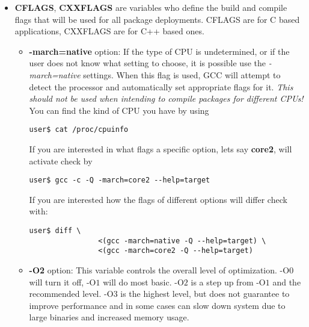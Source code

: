\documentclass[10pt,a4paper]{article}
\begin{document}
                \begin{itemize}
                    \item \textbf{CFLAGS}, \textbf{CXXFLAGS} are variables who define the build and compile flags that will be used for all package deployments. CFLAGS are for C based applications, CXXFLAGS are for C++ based ones.



                    \begin{itemize}[label={o}]

                        \item \textbf{-march=native} option: If the type of CPU is undetermined, or if the user does not know what setting to choose, it is possible use the \textit{-march=native} settings. When this flag is used, GCC will attempt to detect the processor and automatically set appropriate flags for it. \textit{This should not be used when intending to compile packages for different CPUs!}\\
                        You can find the kind of CPU you have by using
    \begin{lstlisting}[style=BashInputUser]
    user$ cat /proc/cpuinfo
    \end{lstlisting}

                        If you are interested in what flags a specific option, lets say \textbf{core2}, will activate check by
    \begin{lstlisting}[style=BashInputUser]
    user$ gcc -c -Q -march=core2 --help=target
    \end{lstlisting}

                        If you are interested how the flags of different options will differ check with:
    \begin{lstlisting}[style=BashInputUser]
    user$ diff \
                <(gcc -march=native -Q --help=target) \
                <(gcc -march=core2 -Q --help=target)
    \end{lstlisting}

                        \item \textbf{-O2} option: This variable controls the overall level of optimization. $ \mbox{-O}0 $ will turn it off, $ \mbox{-O}1 $ will do most basic. $ \mbox{-O}2 $ is a step up from $ \mbox{-O}1 $ and the recommended level. $ \mbox{-O}3 $ is the highest level, but does not guarantee to improve performance and in some cases can slow down system due to large binaries and increased memory usage.


\end{itemize}
\end{itemize}
\end{document}
